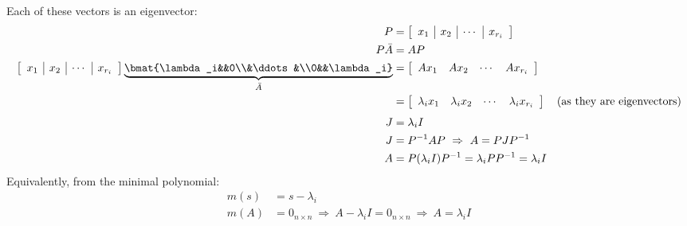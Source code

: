 Each of these vectors is an eigenvector:
\begin{align*}
P&=\left[\begin{array}{c|c|c|c}x_1&x_2&\cdots&x_{r_i}\end{array}\right]\\
P\bar A&=AP\\
\left[\begin{array}{c|c|c|c}x_1&x_2&\cdots&x_{r_i}\end{array}\right]
\underbrace{\bmat{\lambda_i&&0\\&\ddots&\\0&&\lambda_i}}_{\bar A}
&=\left[\begin{array}{cccc}Ax_1&Ax_2&\cdots&Ax_{r_i}\end{array}\right]\\
&=\left[\begin{array}{cccc}\lambda_ix_1&\lambda_ix_2&\cdots&\lambda_ix_{r_i}\end{array}\right]
\quad\text{(as they are eigenvectors)}\\[4pt]
J&=\lambda_iI\\
J&=P^{-1}AP\ \Rightarrow\ A=PJP^{-1}\\
A&=P(\lambda_iI)P^{-1}=\lambda_iPP^{-1}=\lambda_iI
\end{align*}
Equivalently, from the minimal polynomial:
\begin{align*}
m(s)&=s-\lambda_i\\
m(A)&=0_{n\times n}\ \Rightarrow\ A-\lambda_iI=0_{n\times n}\ \Rightarrow\ A=\lambda_iI
\end{align*}

